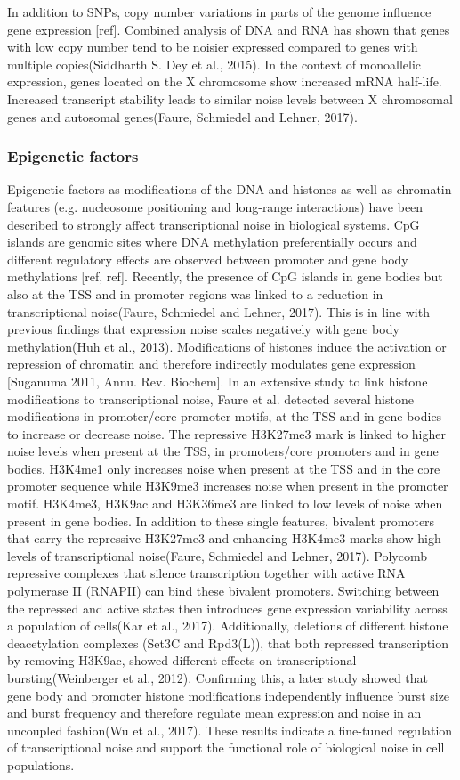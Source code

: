 In addition to SNPs, copy number variations in parts of the genome influence gene expression [ref]. Combined analysis of DNA and RNA has shown that genes with low copy number tend to be noisier expressed compared to genes with multiple copies(Siddharth S. Dey et al., 2015). In the context of monoallelic expression, genes located on the X chromosome show increased mRNA half-life. Increased transcript stability leads to similar noise levels between X chromosomal genes and autosomal genes(Faure, Schmiedel and Lehner, 2017).

\subsubsection{Epigenetic factors}

Epigenetic factors as modifications of the DNA and histones as well as chromatin features (e.g. nucleosome positioning and long-range interactions) have been described to strongly affect transcriptional noise in biological systems.
CpG islands are genomic sites where DNA methylation preferentially occurs and different regulatory effects are observed between promoter and gene body methylations [ref, ref].  Recently, the presence of CpG islands in gene bodies but also at the TSS and in promoter regions was linked to a reduction in transcriptional noise(Faure, Schmiedel and Lehner, 2017). This is in line with previous findings that expression noise scales negatively with gene body methylation(Huh et al., 2013).
Modifications of histones induce the activation or repression of chromatin and  therefore indirectly modulates gene expression [Suganuma 2011, Annu. Rev. Biochem]. In an extensive study to link histone modifications to transcriptional noise, Faure et al. detected several histone modifications in promoter/core promoter motifs, at the TSS and in gene bodies to increase or decrease noise.  The repressive H3K27me3 mark is linked to higher noise levels when present at the TSS, in promoters/core promoters and in gene bodies. H3K4me1 only increases noise when present at the TSS and in the core promoter sequence while H3K9me3 increases noise when present in the promoter motif. H3K4me3, H3K9ac and H3K36me3 are linked to low levels of noise when present in gene bodies. In addition to these single features, bivalent promoters that carry the repressive H3K27me3 and enhancing H3K4me3 marks show high levels of transcriptional noise(Faure, Schmiedel and Lehner, 2017). 
Polycomb repressive complexes that silence transcription together with active RNA polymerase II (RNAPII) can bind these bivalent promoters. Switching between the repressed and active states then introduces gene expression variability across a population of cells(Kar et al., 2017). Additionally, deletions of different histone deacetylation complexes (Set3C and Rpd3(L)), that both repressed transcription by removing H3K9ac, showed different effects on transcriptional bursting(Weinberger et al., 2012).  Confirming this, a later study showed that gene body and promoter histone modifications independently influence burst size and burst frequency and therefore regulate mean expression and noise in an uncoupled fashion(Wu et al., 2017). These results indicate a fine-tuned regulation of transcriptional noise and support the functional role of biological noise in cell populations.
